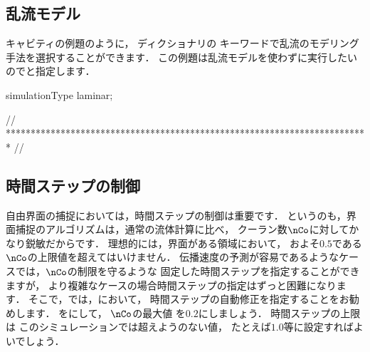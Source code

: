 \subsection{乱流モデル}
\label{ssec:2.3.5@1.6}
キャビティの例題のように，
%
%
ディクショナリの
%
%
キーワードで乱流のモデリング手法を選択することができます．
この例題は乱流モデルを使わずに実行したいのでと指定します．
\begin{OFverbatim}[file, linenum=17]

simulationType  laminar;


// ************************************************************************* //
\end{OFverbatim}


\subsection{時間ステップの制御}
\label{ssec:2.3.5}
自由界面の捕捉においては，時間ステップの制御は重要です．
というのも，界面捕捉のアルゴリズムは，通常の流体計算に比べ，
クーラン数$\nCo$に対してかなり鋭敏だからです．
理想的には，界面がある領域において，
およそ$0.5$である$\nCo$の上限値を超えてはいけません．
伝播速度の予測が容易であるようなケースでは，$\nCo$の制限を守るような
固定した時間ステップを指定することができますが，
より複雑なケースの場合時間ステップの指定はずっと困難になります．
そこで，では，において，
時間ステップの自動修正を指定することをお勧めします．
%
%
をにして，
$\nCo$の最大値
%
%
を$0.2$にしましょう．
時間ステップの上限
%
%
は
このシミュレーションでは超えようのない値，
たとえば$1.0$等に設定すればよいでしょう．

